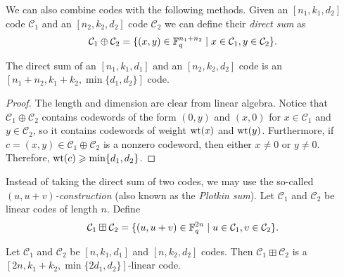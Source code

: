 \documentclass[../main.tex]{subfiles}
\begin{document}
We can also combine codes with the following methods. Given an $[n_1, k_1, d_2]$ code $\mathcal{C}_1$ and an $[n_2, k_2, d_2]$ code $\mathcal{C}_2$ we can define their \emph{direct sum} as
\begin{equation*}
    \mathcal{C}_1 \oplus \mathcal{C}_2 = \{ (x, y) \in \mathbb{F}_q^{n_1 + n_2} \mid x \in \mathcal{C}_1, y \in \mathcal{C}_2 \}.
\end{equation*}

\begin{theorem}
The direct sum of an $[n_1, k_1, d_1]$ and an $[n_2, k_2, d_2]$ code is an $[n_1 + n_2, k_1 + k_2, \min\{d_1, d_2\}]$ code.
\end{theorem}

\begin{proof}
The length and dimension are clear from linear algebra. Notice that $\mathcal{C}_1 \oplus \mathcal{C}_2$ contains codewords of the form $(0, y)$ and $(x, 0)$ for $x \in \mathcal{C}_1$ and $y \in \mathcal{C}_2$, so it contains codewords of weight $\operatorname{wt}(x)$ and $\operatorname{wt}(y)$. Furthermore, if $c = (x, y) \in \mathcal{C}_1 \oplus \mathcal{C}_2$ is a nonzero codeword, then either $x \neq 0$ or $y \neq 0$. Therefore, $\operatorname{wt}(c) \geqslant \min\{d_1, d_2\}$.
\end{proof}

Instead of taking the direct sum of two codes, we may use the so-called \emph{$(u, u + v)$-construction} (also known as the \emph{Plotkin sum}). Let $\mathcal{C}_1$ and $\mathcal{C}_2$ be linear codes of length $n$. Define
\begin{equation*}
    \mathcal{C}_1 \boxplus \mathcal{C}_2 = \{ (u, u + v) \in \mathbb{F}_q^{2n} \mid u \in \mathcal{C}_1, v \in \mathcal{C}_2 \}.
\end{equation*}

\begin{theorem}\label{thm:plotkin_sum}
Let $\mathcal{C}_1$ and $\mathcal{C}_2$ be $[n, k_1, d_1]$ and $[n, k_2, d_2]$ codes. Then $\mathcal{C}_1 \boxplus \mathcal{C}_2$ is a $[2n, k_1 + k_2, \min\{2d_1, d_2\}]$-linear code.
\end{theorem}
\end{document}
